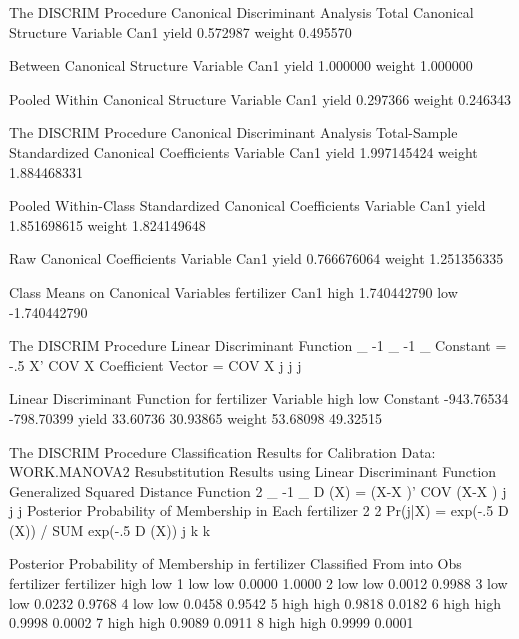 \documentclass{article}
\begin{document}
\begin{Woutput}
The DISCRIM Procedure
Canonical Discriminant Analysis
Total Canonical Structure
Variable              Can1
yield             0.572987
weight            0.495570

Between Canonical Structure
Variable              Can1
yield             1.000000
weight            1.000000

Pooled Within Canonical Structure
Variable              Can1
yield             0.297366
weight            0.246343

The DISCRIM Procedure
Canonical Discriminant Analysis
Total-Sample Standardized Canonical Coefficients
Variable              Can1
yield          1.997145424
weight         1.884468331

Pooled Within-Class Standardized Canonical Coefficients
Variable              Can1
yield          1.851698615
weight         1.824149648

Raw Canonical Coefficients
Variable              Can1
yield          0.766676064
weight         1.251356335

Class Means on Canonical Variables
fertilizer              Can1
high             1.740442790
low             -1.740442790

The DISCRIM Procedure
Linear Discriminant Function
               _     -1 _                              -1 _
Constant = -.5 X' COV   X      Coefficient Vector = COV   X
                j        j                                 j

Linear Discriminant Function for fertilizer
Variable          high           low
Constant    -943.76534    -798.70399
yield         33.60736      30.93865
weight        53.68098      49.32515

The DISCRIM Procedure
Classification Results for Calibration Data: WORK.MANOVA2
Resubstitution Results using Linear Discriminant Function
Generalized Squared Distance Function
 2         _       -1   _
D (X) = (X-X )' COV  (X-X )
 j          j            j
Posterior Probability of Membership in Each fertilizer
                   2                    2
Pr(j|X) = exp(-.5 D (X)) / SUM exp(-.5 D (X))
                   j        k           k

 Posterior Probability of Membership in fertilizer
                     Classified
       From          into
Obs    fertilizer    fertilizer      high       low
  1    low           low           0.0000    1.0000
  2    low           low           0.0012    0.9988
  3    low           low           0.0232    0.9768
  4    low           low           0.0458    0.9542
  5    high          high          0.9818    0.0182
  6    high          high          0.9998    0.0002
  7    high          high          0.9089    0.0911
  8    high          high          0.9999    0.0001


\end{Woutput}
\end{document}
